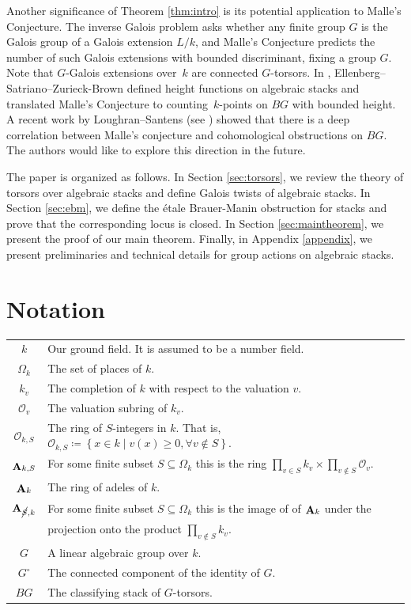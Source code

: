\documentclass[12pt, final]{amsart}
\theoremstyle{remark}
\theoremstyle{definition}
\theoremstyle{plain}
\newcommand{\sO}{\mathcal{O}}
\DeclareMathOperator{\bA}{{\bf A}}
\newcommand{\cS}{\cancel{S}}
\begin{document}
Another significance of Theorem \ref{thm:intro} is its potential application to Malle's Conjecture. The inverse Galois problem asks whether any finite group $G$ is the Galois group of a Galois extension $L/k$, and Malle's Conjecture predicts the number of such Galois extensions with bounded discriminant, fixing a group $G$. Note that $G$-Galois extensions over~$k$ are connected $G$-torsors. In \cite{Ellenberg--Satriano--Zureick-Brown2023}, Ellenberg--Satriano--Zurieck-Brown defined height functions on algebraic stacks and translated Malle's Conjecture to counting~$k$-points on $BG$ with bounded height. 
A recent work by Loughran--Santens (see \cite{loughran-santens25}) showed that there is a deep correlation between Malle's conjecture and cohomological obstructions on $BG$. The authors would like to explore this direction in the future.


The paper is organized as follows. In Section \ref{sec:torsors}, we review the theory of torsors over algebraic stacks and define Galois twists of algebraic stacks. In Section \ref{sec:ebm}, we define the étale Brauer-Manin obstruction for stacks and prove that the corresponding locus is closed. In Section \ref{sec:maintheorem}, we present the proof of our main theorem. Finally, in Appendix \ref{appendix}, we present preliminaries and technical details for group actions on algebraic stacks.


\section*{Notation}


\begin{tabular}{cl}
    $k$ & Our ground field. It is assumed to be a number field.\\
    $\Omega_k$ & The set of places of $k$. \\
    $k_v$ & The completion of $k$ with respect to the valuation $v$.\\
    $\sO_v$ & The valuation subring of $k_v$.\\
    $\sO_{k,S}$ & The ring of $S$-integers in $k$. That is, $\sO_{k,S}\coloneqq \left\{x\in k \mid v(x)\geq 0, \forall v \not \in S\right\}$.\\
    $\bA_{k,S}$ & For some finite subset $S \subseteq \Omega_k$ this is the ring $\prod_{v\in S}k_v \times \prod_{v \not\in S}\sO_v$.\\
    $\bA_k$ & The ring of adeles of $k$.\\
    $\bA_{\cS,k}$ & For some finite subset $S\subseteq \Omega_k$ this is the image of of $\bA_k$ under the \\ & projection onto the product $\prod_{v\not\in S} k_v$. \\
    $G$ & A linear algebraic group over $k$. \\ 
    $G^\circ$ & The connected component of the identity of $G$. \\ 
    $BG$ & The classifying stack of $G$-torsors.
\end{tabular}
\end{document}
